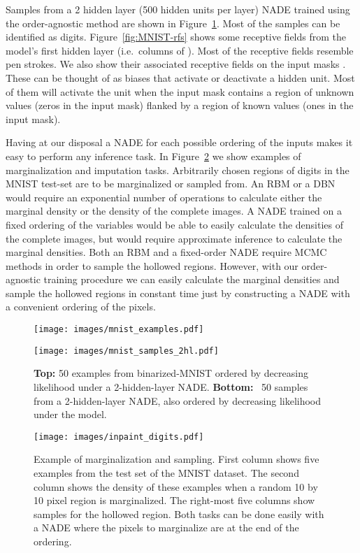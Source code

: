 \documentclass{article}
\newcommand{\ie}{i.e.\ }
\begin{document}
Samples from a 2 hidden layer (500 hidden units per layer) NADE trained using
the order-agnostic method are shown in Figure~\ref{fig:MNIST-samples}.
Most of the samples can be identified as digits.
Figure~\ref{fig:MNIST-rfs} shows some receptive fields from the model's first
hidden layer (\ie columns of ).  Most of the receptive fields resemble
pen strokes. We also show their associated receptive fields on the input masks
. These can be thought of as biases that activate or
deactivate a hidden unit. Most of them will activate the unit when the input
mask contains a region of unknown values (zeros in the input mask) flanked by a
region of known values (ones in the input mask).

Having at our disposal a NADE for each possible ordering of the inputs makes it
easy to perform any inference task. In Figure~\ref{fig:mnist-inpainting} we show
examples of marginalization and imputation tasks. Arbitrarily chosen
regions of digits in the MNIST test-set are to be marginalized or sampled from.
An RBM or a DBN would require an exponential number of operations to
calculate either the marginal density or the density of the complete images.
A NADE trained on a fixed ordering of the variables would be able to easily
calculate the densities of the complete images, but would require approximate
inference to calculate the marginal densities. Both an RBM and a fixed-order
NADE require MCMC methods in order to sample the hollowed regions.
However, with our order-agnostic training procedure we can easily calculate the
marginal densities and sample the hollowed regions in constant time just by
constructing a NADE with a convenient ordering of the pixels.

\begin{figure}
\centerline{\texttt{[image: images/mnist\_examples.pdf]}}
\centerline{\texttt{[image: images/mnist\_samples\_2hl.pdf]}}
\caption{\textbf{Top:} 50 examples from binarized-MNIST ordered by decreasing
likelihood under a 2-hidden-layer NADE\@. \textbf{Bottom:}~ 50 samples from a
2-hidden-layer NADE\@, also ordered by decreasing likelihood under the model.}
\label{fig:MNIST-samples}
\end{figure}

\begin{figure}
\centerline{\texttt{[image: images/inpaint\_digits.pdf]}}
\caption{Example of marginalization and sampling. First column shows five
examples from the test set of the MNIST dataset. The second column shows
the density of these examples when a random 10 by 10 pixel region is
marginalized. The right-most five columns show samples for the hollowed
region. Both tasks can be done easily with a NADE where the pixels to marginalize are at the end of the ordering.}
\label{fig:mnist-inpainting}
\end{figure}
\end{document}
